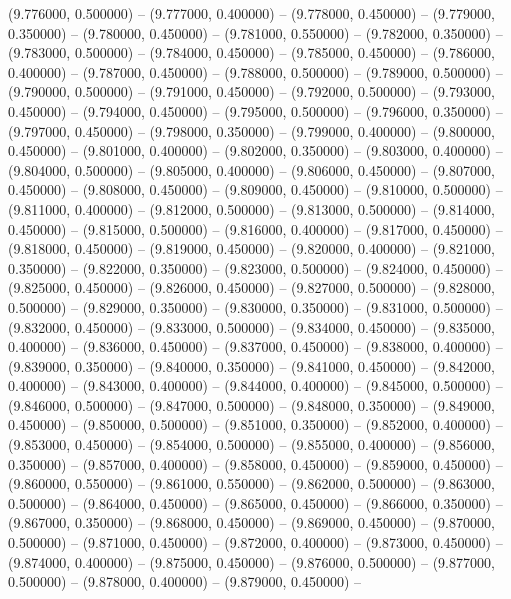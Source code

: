 (9.776000, 0.500000) -- 
(9.777000, 0.400000) -- 
(9.778000, 0.450000) -- 
(9.779000, 0.350000) -- 
(9.780000, 0.450000) -- 
(9.781000, 0.550000) -- 
(9.782000, 0.350000) -- 
(9.783000, 0.500000) -- 
(9.784000, 0.450000) -- 
(9.785000, 0.450000) -- 
(9.786000, 0.400000) -- 
(9.787000, 0.450000) -- 
(9.788000, 0.500000) -- 
(9.789000, 0.500000) -- 
(9.790000, 0.500000) -- 
(9.791000, 0.450000) -- 
(9.792000, 0.500000) -- 
(9.793000, 0.450000) -- 
(9.794000, 0.450000) -- 
(9.795000, 0.500000) -- 
(9.796000, 0.350000) -- 
(9.797000, 0.450000) -- 
(9.798000, 0.350000) -- 
(9.799000, 0.400000) -- 
(9.800000, 0.450000) -- 
(9.801000, 0.400000) -- 
(9.802000, 0.350000) -- 
(9.803000, 0.400000) -- 
(9.804000, 0.500000) -- 
(9.805000, 0.400000) -- 
(9.806000, 0.450000) -- 
(9.807000, 0.450000) -- 
(9.808000, 0.450000) -- 
(9.809000, 0.450000) -- 
(9.810000, 0.500000) -- 
(9.811000, 0.400000) -- 
(9.812000, 0.500000) -- 
(9.813000, 0.500000) -- 
(9.814000, 0.450000) -- 
(9.815000, 0.500000) -- 
(9.816000, 0.400000) -- 
(9.817000, 0.450000) -- 
(9.818000, 0.450000) -- 
(9.819000, 0.450000) -- 
(9.820000, 0.400000) -- 
(9.821000, 0.350000) -- 
(9.822000, 0.350000) -- 
(9.823000, 0.500000) -- 
(9.824000, 0.450000) -- 
(9.825000, 0.450000) -- 
(9.826000, 0.450000) -- 
(9.827000, 0.500000) -- 
(9.828000, 0.500000) -- 
(9.829000, 0.350000) -- 
(9.830000, 0.350000) -- 
(9.831000, 0.500000) -- 
(9.832000, 0.450000) -- 
(9.833000, 0.500000) -- 
(9.834000, 0.450000) -- 
(9.835000, 0.400000) -- 
(9.836000, 0.450000) -- 
(9.837000, 0.450000) -- 
(9.838000, 0.400000) -- 
(9.839000, 0.350000) -- 
(9.840000, 0.350000) -- 
(9.841000, 0.450000) -- 
(9.842000, 0.400000) -- 
(9.843000, 0.400000) -- 
(9.844000, 0.400000) -- 
(9.845000, 0.500000) -- 
(9.846000, 0.500000) -- 
(9.847000, 0.500000) -- 
(9.848000, 0.350000) -- 
(9.849000, 0.450000) -- 
(9.850000, 0.500000) -- 
(9.851000, 0.350000) -- 
(9.852000, 0.400000) -- 
(9.853000, 0.450000) -- 
(9.854000, 0.500000) -- 
(9.855000, 0.400000) -- 
(9.856000, 0.350000) -- 
(9.857000, 0.400000) -- 
(9.858000, 0.450000) -- 
(9.859000, 0.450000) -- 
(9.860000, 0.550000) -- 
(9.861000, 0.550000) -- 
(9.862000, 0.500000) -- 
(9.863000, 0.500000) -- 
(9.864000, 0.450000) -- 
(9.865000, 0.450000) -- 
(9.866000, 0.350000) -- 
(9.867000, 0.350000) -- 
(9.868000, 0.450000) -- 
(9.869000, 0.450000) -- 
(9.870000, 0.500000) -- 
(9.871000, 0.450000) -- 
(9.872000, 0.400000) -- 
(9.873000, 0.450000) -- 
(9.874000, 0.400000) -- 
(9.875000, 0.450000) -- 
(9.876000, 0.500000) -- 
(9.877000, 0.500000) -- 
(9.878000, 0.400000) -- 
(9.879000, 0.450000) -- 

